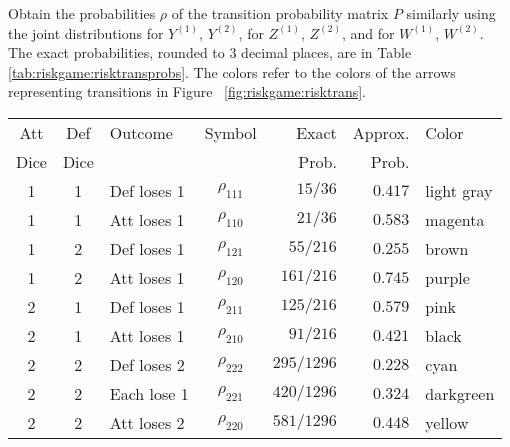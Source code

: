 \documentclass[12pt]{article}
\begin{document}
Obtain the probabilities \( \rho \) of the transition probability matrix
\( P \) similarly using the joint distributions for \( Y^{(1)} \), \( Y^
{(2)} \), for \( Z^{(1)} \), \( Z^{(2)} \), and for \( W^{(1)} \), \( W^
{(2)} \).  The exact probabilities, rounded to \( 3 \) decimal places,
are in Table~%
\ref{tab:riskgame:risktransprobs}.  The colors refer to the colors of
the arrows representing transitions in Figure~%
\ref{fig:riskgame:risktrans}.

\begin{table}
    \centering
    \begin{tabular}{cclcrrl}
        Att    & Def      & Outcome     & Symbol       & Exact       & Approx. & Color      \\ 
        Dice   & Dice     &             &              & Prob.       & Prob.   &            \\ 
        \hline
        1      & 1        & Def loses 1 & $\rho_{111}$ & $15/36$     & $0.417$ & light gray \\ %
         
        1      & 1        & Att loses 1 & $\rho_{110}$ & $21/36$     & $0.583$ & magenta    \\ %
         
        \hline
        1      & 2        & Def loses 1 & $\rho_{121}$ & $55/216$    & $0.255$ & brown      \\ %
         
        1      & 2        & Att loses 1 & $\rho_{120}$ & $161/216$   & $0.745$ & purple     \\ %
         
        \hline
        2      & 1        & Def loses 1 & $\rho_{211}$ & $125/216$   & $0.579$ & pink       \\ %
         
        2      & 1        & Att loses 1 & $\rho_{210}$ & $91/216$    & $0.421$ & black      \\ %
         
        \hline
        2      & 2        & Def loses 2 & $\rho_{222}$ & $295/1296$  & $0.228$  & cyan       \\ %
         
        2      & 2        & Each lose 1 & $\rho_{221}$ & $420/1296$  & $0.324$ & darkgreen  \\ 
        2      & 2        & Att loses 2 & $\rho_{220}$ & $581/1296$  & $0.448$ & yellow     \\ %
         

\end{tabular}
\end{table}
\end{document}
